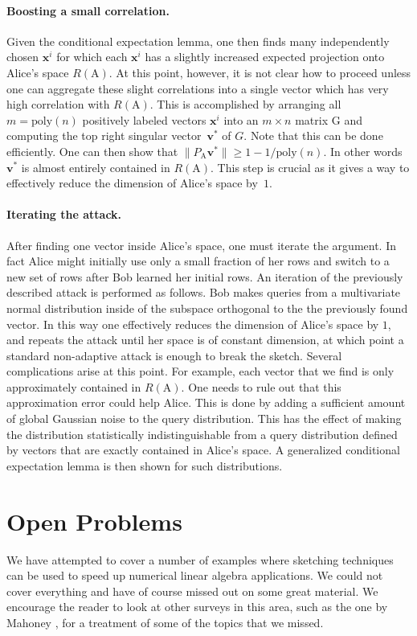 \documentclass[11pt]{article}
\newcommand{\mat}[1]{{\ensuremath{\bm{\mathrm{#1}}}}}
\def\ve{{\mathbf v}}
\def\matA{\mat{A}}
\def\matG{\mat{G}}
\def\x{{\mathbf x}}
\newcommand{\poly}{{\mathrm{poly}}}
\begin{document}
\paragraph{Boosting a small correlation.}
Given the conditional expectation lemma, one then finds many independently
chosen $\x^i$ for which each $\x^i$ has a slightly increased expected projection
onto Alice's space $R(\matA)$. At this point, however, it is not clear how to
proceed unless one can aggregate these slight correlations into a single vector
which has very high correlation with $R(\matA).$ This is accomplished by arranging
all $m=\poly(n)$ positively labeled vectors $\x^i$ into an $m\times n$ matrix $\matG$ and
computing the top right singular vector~$\ve^*$ of $G.$ Note that this can be
done efficiently.  One can then show that $\|P_{\matA}\ve^*\|\ge 1-1/\poly(n).$ In
other words $\ve^*$ is almost entirely contained in $R(\matA).$ This step is crucial
as it gives a way to effectively reduce the dimension of Alice's space
by~$1$. 

\paragraph{Iterating the attack.}
After finding one vector inside Alice's space, one must iterate the argument. In fact 
Alice might initially use only a small fraction of her rows and switch to a new set
of rows after Bob learned her initial rows.
An iteration of the previously described attack is performed as follows. Bob makes
queries from a multivariate normal distribution inside of the subspace
orthogonal to the the previously found vector. In this way one effectively
reduces the dimension of Alice's space by $1$, and repeats the attack
until her space is of constant dimension, at which point a standard
non-adaptive attack is enough to break the sketch. Several complications
arise at this point. For example, each vector that we find is only approximately contained
in $R(\matA).$ One needs to rule out that this approximation error could help Alice.
This is done by adding a sufficient amount of global Gaussian noise to the query
distribution. This has the effect of making the distribution statistically
indistinguishable from a query distribution defined by vectors that are exactly
contained in Alice's space. A generalized
conditional expectation lemma is then shown for such distributions.

\section{Open Problems}
We have attempted to cover a number of examples where sketching techniques can be used to speed
up numerical linear algebra applications. We could not cover everything and have of course missed out
on some great material. We encourage the reader to look at other surveys in this area, such
as the one by Mahoney \cite{m11}, for a treatment of some of the topics that we missed. 
\end{document}

